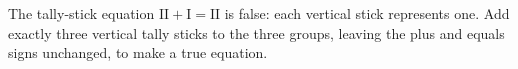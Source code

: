 The tally-stick equation $\mathrm{II}+\mathrm{I}=\mathrm{II}$ is false: each vertical stick represents one. Add exactly three vertical tally sticks to the three groups, leaving the plus and equals signs unchanged, to make a true equation.
